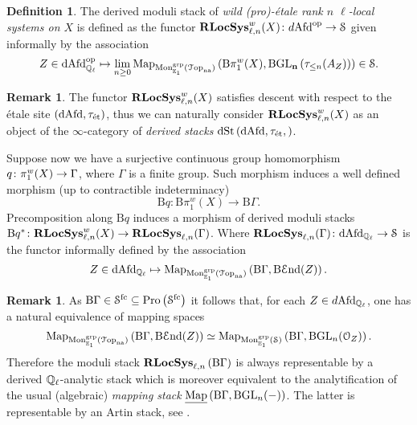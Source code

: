 \documentclass[10pt,a4paper]{amsart}
\numberwithin{equation}{subsection}
\theoremstyle{plain}
\theoremstyle{definition}
\newtheorem{defi}[theorem]{Definition}
\newtheorem{rema}[theorem]{Remark}
\theoremstyle{remark}
\numberwithin{equation}{section}
\begin{document}
\begin{defi}
The derived moduli stack of \emph{wild (pro)-\'etale rank $n$ $\ell$-local systems on $X$} is defined as the functor $\mathbf R \mathbf{LocSys}_{\ell, n}^w(X) \colon d \mathrm{Afd}^{\mathrm{op}} \to \mathcal S$ given informally by the association
	\[
		Z \in \mathrm{dAfd}_{\mathbb{Q}_\ell}^{\mathrm{op}} \mapsto \lim_{n \geq 0} \mathrm{Map}_{\mathrm{Mon}^{\mathrm{grp}}_{\mathbb E_1}(\mathcal{T} \mathrm{op}_{\mathrm{na}})} \left( \mathrm B \pi_1^w(X), \mathbf{ \mathrm B \mathrm{GL}_n} \left( \tau_{\leq n}(A_Z) \right) \right) \in \mathcal S.
	\]
\end{defi}

\begin{rema}
The functor $ \mathbf R \mathbf{LocSys}_{\ell, n}^w(X)$ satisfies descent with respect to the \'etale site $( \mathrm{dAfd}, \tau_{\text{\'et}})$, thus we can naturally consider $ \mathbf R \mathbf{LocSys}_{\ell, n}^w(X)$ as an object of the $\infty$-category of \emph{derived stacks} $\mathrm{dSt} \left( \mathrm{dAfd} , \tau_{\text{\'et}}, \right)$.
\end{rema}

Suppose now we have a surjective continuous group homomorphism $q \colon \pi_1^w(X) \to \Gamma$, where $\Gamma$ is a finite group. Such morphism induces a well defined morphism (up to contractible indeterminacy) 
	\[
		\mathrm B q \colon \mathrm B \pi_1^w ( X) \to \mathrm B \Gamma.
	\]
Precomposition along $\mathrm B q$ induces a morphism of derived moduli stacks $\mathrm B q^* \colon \mathbf R \mathbf{LocSys}_{\ell, n}^w(X) \to \mathbf R \mathbf{LocSys}_{\ell, n}(\Gamma)$. Where $\mathbf R \mathbf{LocSys}_{\ell, n}(\Gamma) \colon  \mathrm{dAfd}_{\mathbb{Q}_\ell} \to \mathcal S$ is the functor informally defined by the association
	\[
		Z \in \mathrm{dAfd}_{\mathbb{Q}_\ell} \mapsto \mathrm{Map}_{\mathrm{Mon}^{\mathrm{grp}}_{\mathbb E_1}(\mathcal{T} \mathrm{op}_{\mathrm{na}})} \left( \mathrm B \Gamma,  \mathrm B \mathcal E \mathrm{nd}(Z)\right) .
	\]	

\begin{rema}
As $\mathrm B \Gamma \in \mathcal S^{\mathrm{fc}} \subseteq \mathrm{Pro} \left( \mathcal S^{\mathrm{fc}} \right)$ it follows that, for each $Z \in d \mathrm{Afd}_{\mathbb{Q}_\ell}$, one has a natural equivalence of mapping spaces
	\[
		\mathrm{Map}_{\mathrm{Mon}^{\mathrm{grp}}_{\mathbb{E}_1}( \mathcal{T} \mathrm{op}_{\mathrm{na}})} \left( \mathrm B \Gamma,\mathrm{B} \mathcal E \mathrm{nd}(Z) \right) \simeq \mathrm{Map}_{\mathrm{Mon}_{\mathbb E_1}^{\mathrm{grp}} (\mathcal S)} \left( \mathrm B \Gamma,  \mathrm B \mathrm{GL}_n(\mathcal{O}_Z) \right).
	\]
Therefore the moduli stack $\mathbf R \mathbf{LocSys}_{\ell, n} \left(\mathrm B \Gamma \right) $ is always representable by a derived $\mathbb{Q}_\ell$-analytic stack which is moreover equivalent to the analytification of the usual (algebraic) \emph{mapping stack}
$\underline{\mathbf{\mathrm{Map}} }\left( \mathrm B \Gamma, \mathrm B \mathrm{GL}_n(-) \right) $. The latter is representable by an Artin stack, see \cite[Proposition 19.2.3.3.]{lurieSAG}.
\end{rema}
\end{document}
